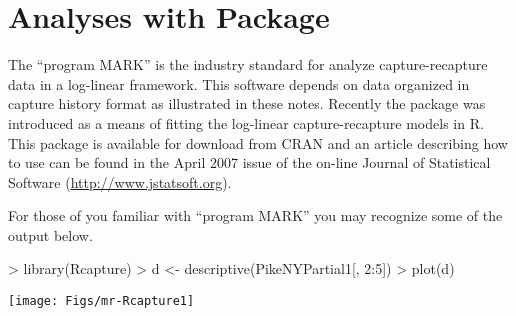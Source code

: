 \documentclass[a4paper]{article}
\begin{document}
\section{Analyses with  Package}
The ``program MARK'' is the industry standard for analyze capture-recapture data in a log-linear framework.  This software depends on data organized in capture history format as illustrated in these notes.  Recently the  package was introduced as a means of fitting the log-linear capture-recapture models in R.  This package is available for download from CRAN and an article describing how to use  can be found in the April 2007 issue of the on-line Journal of Statistical Software (\url{http://www.jstatsoft.org}).

For those of you familiar with ``program MARK'' you may recognize some of the output below.

\begin{Schunk}
\begin{Sinput}
> library(Rcapture)
> d <- descriptive(PikeNYPartial1[, 2:5])
> plot(d)
\end{Sinput}
\end{Schunk}
\texttt{[image: Figs/mr-Rcapture1]}
\end{document}
